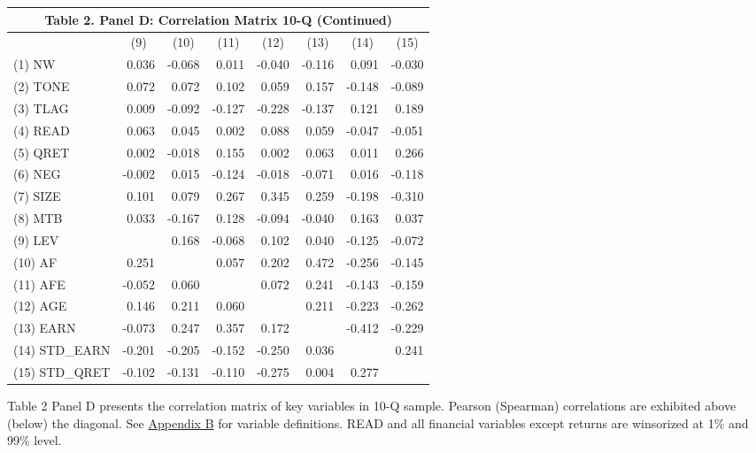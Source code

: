 \begin{table}[H]
  \begin{center}
  	\begin{tabular}{lrrrrrrr}
  		\multicolumn{8}{c}{\textbf{Table 2. Panel D: Correlation Matrix 10-Q (Continued) }} \\
  		\midrule
  		\midrule
  		& \multicolumn{1}{c}{(9)} & \multicolumn{1}{c}{(10)} & \multicolumn{1}{c}{(11)} & \multicolumn{1}{c}{(12)} & \multicolumn{1}{c}{(13)} & \multicolumn{1}{c}{(14)} & \multicolumn{1}{c}{(15)} \\
  		\midrule
  		(1) NW & 0.036 & -0.068 & 0.011 & -0.040 & -0.116 & 0.091 & -0.030 \\
  		(2) TONE & 0.072 & 0.072 & 0.102 & 0.059 & 0.157 & -0.148 & -0.089 \\
  		(3) TLAG & 0.009 & -0.092 & -0.127 & -0.228 & -0.137 & 0.121 & 0.189 \\
  		(4) READ & 0.063 & 0.045 & 0.002 & 0.088 & 0.059 & -0.047 & -0.051 \\
  		(5) QRET & 0.002 & -0.018 & 0.155 & 0.002 & 0.063 & 0.011 & 0.266 \\
  		(6) NEG & -0.002 & 0.015 & -0.124 & -0.018 & -0.071 & 0.016 & -0.118 \\
  		(7) SIZE & 0.101 & 0.079 & 0.267 & 0.345 & 0.259 & -0.198 & -0.310 \\
  		(8) MTB & 0.033 & -0.167 & 0.128 & -0.094 & -0.040 & 0.163 & 0.037 \\
  		(9) LEV &  & 0.168 & -0.068 & 0.102 & 0.040 & -0.125 & -0.072 \\
  		(10) AF & 0.251 &  & 0.057 & 0.202 & 0.472 & -0.256 & -0.145 \\
  		(11) AFE & -0.052 & 0.060 &  & 0.072 & 0.241 & -0.143 & -0.159 \\
  		(12) AGE & 0.146 & 0.211 & 0.060 &  & 0.211 & -0.223 & -0.262 \\
  		(13) EARN & -0.073 & 0.247 & 0.357 & 0.172 &  & -0.412 & -0.229 \\
  		(14) STD\_EARN & -0.201 & -0.205 & -0.152 & -0.250 & 0.036 &  & 0.241 \\
  		(15) STD\_QRET & -0.102 & -0.131 & -0.110 & -0.275 & 0.004 & 0.277 & \\
  		\bottomrule
  		\bottomrule
  	\end{tabular}%
  \end{center}
	\begin{footnotesize}
		\noindent Table 2 Panel D presents the correlation matrix of key variables in 10-Q sample. Pearson (Spearman) correlations are exhibited above (below) the diagonal. See \hyperref[appb]{Appendix B} for variable definitions. READ and all financial variables except returns are winsorized at 1\% and 99\% level. 
	\end{footnotesize}
\end{table}%